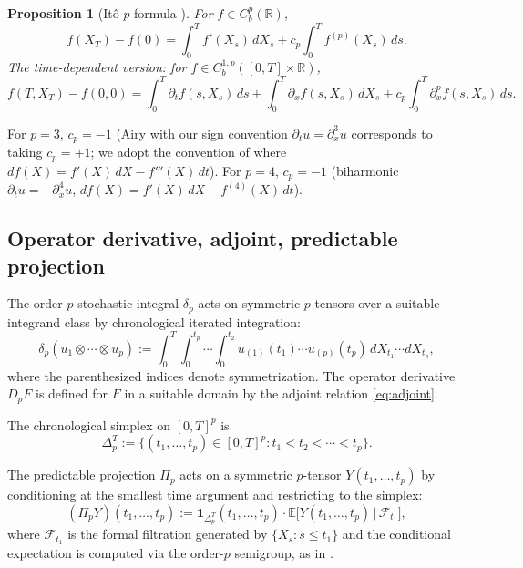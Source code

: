 \documentclass[11pt,reqno]{amsart}
\theoremstyle{plain}
\newtheorem{proposition}[theorem]{Proposition}
\theoremstyle{definition}
\newcommand{\E}{\mathbb{E}}
\newcommand{\R}{\mathbb{R}}
\newcommand{\simplex}{\Delta_p^T}
\begin{document}
\begin{proposition}[Itô-$p$ formula \cite{operatorDerivativeII}]
\label{prop:Itop}
For $f \in C^p_b(\R)$,
\begin{equation}
\label{eq:Itop}
f(X_T) - f(0) = \int_0^T f'(X_s)\, dX_s + c_p \int_0^T f^{(p)}(X_s)\, ds.
\end{equation}
The time-dependent version: for $f \in C^{1,p}_b([0,T] \times \R)$,
\begin{equation}
\label{eq:Itop-time}
f(T, X_T) - f(0, 0) = \int_0^T \partial_t f(s, X_s)\, ds + \int_0^T \partial_x f(s, X_s)\, dX_s + c_p \int_0^T \partial_x^p f(s, X_s)\, ds.
\end{equation}
\end{proposition}

For $p=3$, $c_p = -1$ (Airy with our sign convention $\partial_t u = \partial_x^3 u$ corresponds to taking $c_p = +1$; we adopt the convention of \cite[\S 4]{operatorDerivativeII} where $df(X) = f'(X)\, dX - f'''(X)\, dt$). For $p=4$, $c_p = -1$ (biharmonic $\partial_t u = -\partial_x^4 u$, $df(X) = f'(X)\, dX - f^{(4)}(X)\, dt$).

\subsection{Operator derivative, adjoint, predictable projection}

The order-$p$ stochastic integral $\delta_p$ acts on symmetric $p$-tensors over a suitable integrand class by chronological iterated integration:
\begin{equation}
\label{eq:delta-p}
\delta_p(u_1 \otimes \cdots \otimes u_p)
:= \int_0^T \int_0^{t_p} \cdots \int_0^{t_2} u_{(1)}(t_1) \cdots u_{(p)}(t_p)\, dX_{t_1} \cdots dX_{t_p},
\end{equation}
where the parenthesized indices denote symmetrization. The operator derivative $D_p F$ is defined for $F$ in a suitable domain by the adjoint relation \eqref{eq:adjoint}.

The chronological simplex on $[0,T]^p$ is
\begin{equation}
\simplex := \{(t_1, \ldots, t_p) \in [0,T]^p : t_1 < t_2 < \cdots < t_p\}.
\end{equation}

The predictable projection $\Pi_p$ acts on a symmetric $p$-tensor $Y(t_1, \ldots, t_p)$ by conditioning at the smallest time argument and restricting to the simplex:
\begin{equation}
\label{eq:Pip}
(\Pi_p Y)(t_1, \ldots, t_p) := \mathbf{1}_{\simplex}(t_1, \ldots, t_p) \cdot \E\bigl[Y(t_1, \ldots, t_p) \,\big|\, \mathcal{F}_{t_1}\bigr],
\end{equation}
where $\mathcal{F}_{t_1}$ is the formal filtration generated by $\{X_s : s \leq t_1\}$ and the conditional expectation is computed via the order-$p$ semigroup, as in \cite[\S 5]{operatorDerivativeII}.
\end{document}
